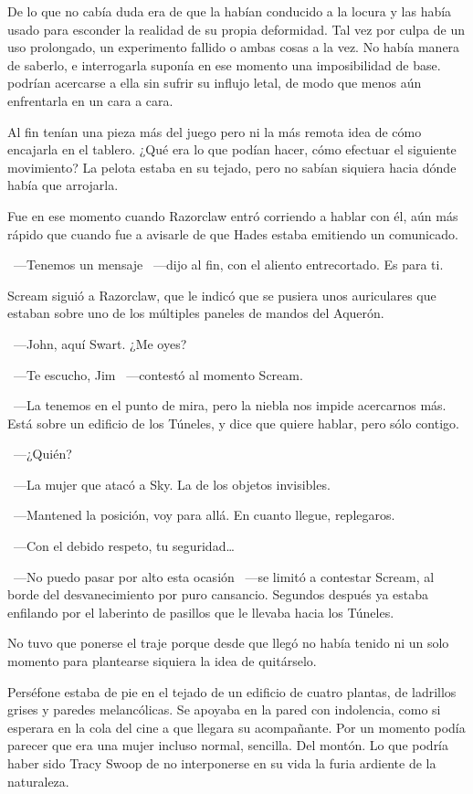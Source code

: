 De lo que no cabía duda era de que la habían conducido a la locura y las había usado para esconder la realidad de su propia deformidad. Tal vez por culpa de un uso prolongado, un experimento fallido o ambas cosas a la vez. No había manera de saberlo, e interrogarla suponía en ese momento una imposibilidad de base.  podrían acercarse a ella sin sufrir su influjo letal, de modo que menos aún enfrentarla en un cara a cara.

Al fin tenían una pieza más del juego pero ni la más remota idea de cómo encajarla en el tablero. ¿Qué era lo que podían hacer, cómo efectuar el siguiente movimiento? La pelota estaba en su tejado, pero no sabían siquiera hacia dónde había que arrojarla.

Fue en ese momento cuando Razorclaw entró corriendo a hablar con él, aún más rápido que cuando fue a avisarle de que Hades estaba emitiendo un comunicado.

~---Tenemos un mensaje ~---dijo al fin, con el aliento entrecortado. Es para ti.

Scream siguió a Razorclaw, que le indicó que se pusiera unos auriculares que estaban sobre uno de los múltiples paneles de mandos del Aquerón.

~---John, aquí Swart. ¿Me oyes?

~---Te escucho, Jim ~---contestó al momento Scream.

~---La tenemos en el punto de mira, pero la niebla nos impide acercarnos más. Está sobre un edificio de los Túneles, y dice que quiere hablar, pero sólo contigo.

~---¿Quién?

~---La mujer que atacó a Sky. La de los objetos invisibles.

~---Mantened la posición, voy para allá. En cuanto llegue, replegaros.

~---Con el debido respeto, tu seguridad\dots

~---No puedo pasar por alto esta ocasión ~---se limitó a contestar Scream, al borde del desvanecimiento por puro cansancio. Segundos después ya estaba enfilando por el laberinto de pasillos que le llevaba hacia los Túneles.

No tuvo que ponerse el traje porque desde que llegó no había tenido ni un solo momento para plantearse siquiera la idea de quitárselo.

\parbreak
Perséfone estaba de pie en el tejado de un edificio de cuatro plantas, de ladrillos grises y paredes melancólicas. Se apoyaba en la pared con indolencia, como si esperara en la cola del cine a que llegara su acompañante. Por un momento podía parecer que era una mujer incluso normal, sencilla. Del montón. Lo que podría haber sido Tracy Swoop de no interponerse en su vida la furia ardiente de la naturaleza.

